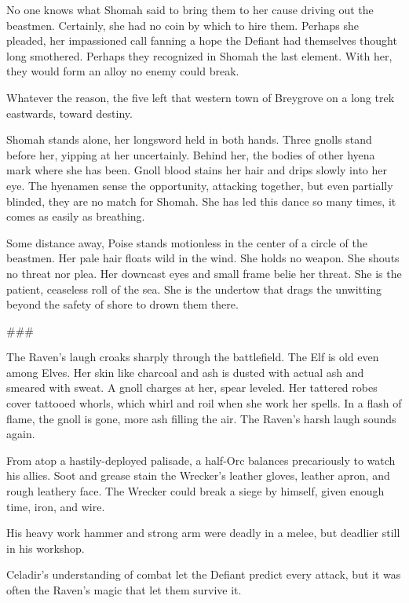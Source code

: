 No one knows what Shomah said to bring them to her cause driving out the beastmen.
Certainly, she had no coin by which to hire them.
Perhaps she pleaded, her impassioned call fanning a hope the Defiant had themselves
  thought long smothered.
Perhaps they recognized in Shomah the last element.
With her, they would form an alloy no enemy could break.

Whatever the reason, the five left that western town of Breygrove on a long trek eastwards, toward
destiny.

\hrulefill

Shomah stands alone, her longsword held in both hands.
Three gnolls stand before her, yipping at her uncertainly.
Behind her, the bodies of other hyena mark where she has been.
Gnoll blood stains her hair and drips slowly into her eye.
The hyenamen sense the opportunity, attacking together, but even partially blinded, they are no
  match for Shomah.
She has led this dance so many times, it comes as easily as breathing.

Some distance away, Poise stands motionless in the center of a circle of the beastmen.
Her pale hair floats wild in the wind.
She holds no weapon.
She shouts no threat nor plea.
Her downcast eyes and small frame belie her threat.
She is the patient, ceaseless roll of the sea.
She is the undertow that drags the unwitting beyond the safety of shore to drown them there.

###

The Raven's laugh croaks sharply through the battlefield.
The Elf is old even among Elves.
Her skin like charcoal and ash is dusted with actual ash and smeared with sweat.
A gnoll charges at her, spear leveled.
Her tattered robes cover tattooed whorls, which whirl and roil when she work her spells.
In a flash of flame, the gnoll is gone, more ash filling the air.
The Raven's harsh laugh sounds again.

From atop a hastily-deployed palisade, a half-Orc balances precariously to watch his allies.
Soot and grease stain the Wrecker's leather gloves, leather apron, and rough leathery face.
The Wrecker could break a siege by himself, given enough time, iron, and wire.


His heavy work hammer and strong arm were deadly in a melee, but deadlier still in his workshop.









Celadir's understanding of combat let the Defiant predict every attack,
but it was often the Raven's magic that let them survive it.


